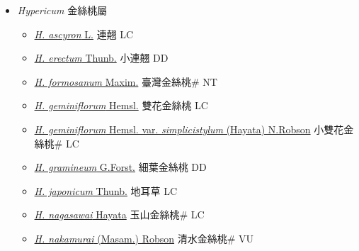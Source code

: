 
  \begin{itemize}
 \item[] \textit{Hypericum} 金絲桃屬
                    
  \begin{itemize}
        \item[] \href{http://www.theplantlist.org/tpl1.1/search?q=Hypericum+ascyron}{\textit{H. ascyron} L.}   連翹 LC
        \item[] \href{http://www.theplantlist.org/tpl1.1/search?q=Hypericum+erectum}{\textit{H. erectum} Thunb.}   小連翹 DD
        \item[] \href{http://www.theplantlist.org/tpl1.1/search?q=Hypericum+formosanum}{\textit{H. formosanum} Maxim.}   臺灣金絲桃\# NT
        \item[] \href{http://www.theplantlist.org/tpl1.1/search?q=Hypericum+geminiflorum}{\textit{H. geminiflorum} Hemsl.}   雙花金絲桃 LC
        \item[] \href{http://www.theplantlist.org/tpl1.1/search?q=Hypericum+geminiflorum+var.+simplicistylum}{\textit{H. geminiflorum} Hemsl. var. \textit{simplicistylum} (Hayata) N.Robson}   小雙花金絲桃\# LC
        \item[] \href{http://www.theplantlist.org/tpl1.1/search?q=Hypericum+gramineum}{\textit{H. gramineum} G.Forst.}   細葉金絲桃 DD
        \item[] \href{http://www.theplantlist.org/tpl1.1/search?q=Hypericum+japonicum}{\textit{H. japonicum} Thunb.}   地耳草 LC
        \item[] \href{http://www.theplantlist.org/tpl1.1/search?q=Hypericum+nagasawai}{\textit{H. nagasawai} Hayata}   玉山金絲桃\# LC
        \item[] \href{http://www.theplantlist.org/tpl1.1/search?q=Hypericum+nakamurai}{\textit{H. nakamurai} (Masam.) Robson}   清水金絲桃\# VU

\end{itemize}
\end{itemize}
